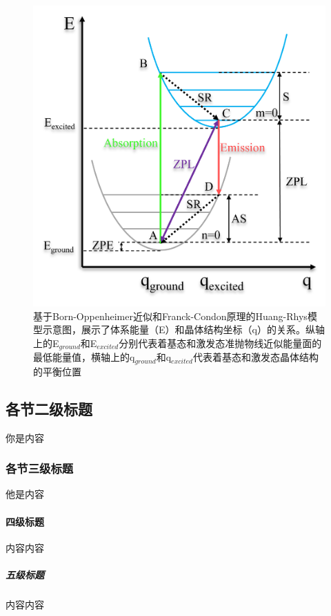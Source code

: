 \documentclass[type = bachelor]{whu-thesis}
\begin{document}
\begin{figure}
  \centering
  \includegraphics[width=1.0\textwidth]{figures/Chapter 2/Franck-Condon.png}
  \caption[基于Born-Oppenheimer近似和Franck-Condon原理的Huang-Rhys模型示意图]{基于Born-Oppenheimer近似和Franck-Condon原理的Huang-Rhys模型示意图，展示了体系能量（E）和晶体结构坐标（q）的关系。纵轴上的E$_{ground}$和E$_{excited}$分别代表着基态和激发态准抛物线近似能量面的最低能量值，横轴上的q$_{ground}$和q$_{excited}$代表着基态和激发态晶体结构的平衡位置}
  \label{fig: Franck-Condon}
\end{figure}


\subsection{各节二级标题}
你是内容

\subsubsection{各节三级标题}
他是内容

\paragraph{四级标题}
内容内容

\subparagraph{五级标题}
内容内容
\end{document}
